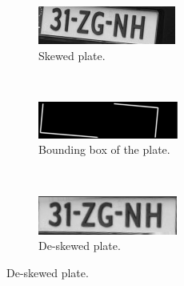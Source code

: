 \begin{figure}[h]
        \centering
        \begin{subfigure}{0.33\textwidth}
            \includegraphics[width=\textwidth]{plaatjes/skewed-plate}
            \caption{Skewed plate.}
            \label{fig:skewed-plate}
        \end{subfigure}%
        ~ 
        \begin{subfigure}{0.33\textwidth}
            \includegraphics[width=\textwidth]{plaatjes/skewed-plate-box}
            \caption{Bounding box of the plate.}
            \label{fig:skewed-bounding-box}
        \end{subfigure}%
        ~ 
        \begin{subfigure}{0.33\textwidth}
            \includegraphics[width=\textwidth]{plaatjes/rotated-plate}
            \caption{De-skewed plate.}
            \label{fig:rotated-plate}
        \end{subfigure}%


\end{figure}
